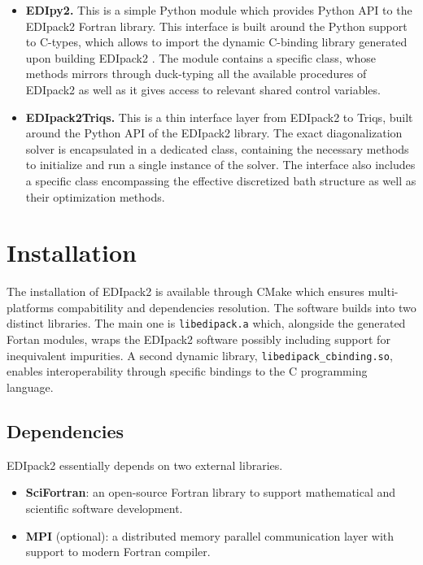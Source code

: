 \documentclass[final,3p,10pt]{elsarticle}
\def\NAME{{\rm EDIpack2 }}
\begin{document}
\begin{itemize}
\item{\bf EDIpy2.}
This is a simple Python module which provides Python API to the
\NAME Fortran library. This interface is built around the Python
support to C-types, which allows to import the dynamic C-binding
library generated upon building \NAME. The module contains a specific
class, whose methods mirrors through  duck-typing all the available
procedures of \NAME as well as it gives access to relevant shared
control variables.




\item{\bf EDIpack2Triqs.}
This is a thin interface layer from \NAME to Triqs,
built around the Python API of the \NAME library. The exact
diagonalization solver is encapsulated in a dedicated class,
containing the necessary methods to initialize and run a single
instance of the solver. The interface also includes a specific class
encompassing the effective discretized bath structure as well as their 
optimization methods.  

  
\end{itemize}








\section{Installation}\label{SecInstall}
The installation of \NAME is available through CMake which ensures
multi-platforms compabitility and dependencies resolution.  
The software builds into two distinct libraries.
The main one is {\tt  libedipack.a} which, alongside the generated Fortan
modules, wraps the \NAME software possibly including support for  
inequivalent impurities.
A second dynamic library, {\tt libedipack\_cbinding.so}, enables interoperability through
specific bindings to the C programming language.    

\subsection{Dependencies}
\NAME essentially depends on two external libraries.
\begin{itemize}
\item {\bf SciFortran}: an open-source Fortran library to support
  mathematical and scientific software development. 
\item {\bf MPI} (optional): a distributed memory parallel communication layer with support to modern Fortran compiler.
\end{itemize}
 
\end{document}
